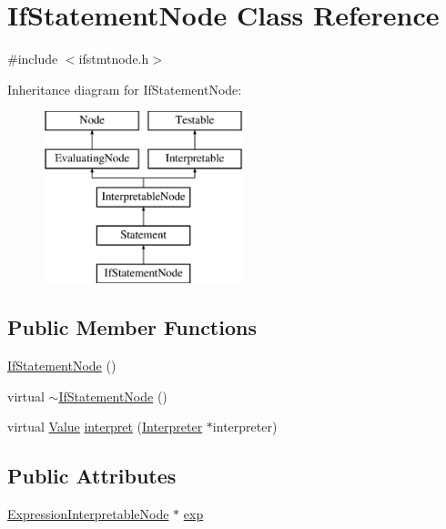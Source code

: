 \hypertarget{classIfStatementNode}{}\section{If\+Statement\+Node Class Reference}
\label{classIfStatementNode}


{\ttfamily \#include $<$ifstmtnode.\+h$>$}

Inheritance diagram for If\+Statement\+Node\+:\begin{figure}[H]
\begin{center}
\leavevmode
\includegraphics[height=5.000000cm]{classIfStatementNode}
\end{center}
\end{figure}
\subsection*{Public Member Functions}
\begin{DoxyCompactItemize}
\item 
\hyperlink{classIfStatementNode_a99188e8333e6d12e816bd5ba319a7da8}{If\+Statement\+Node} ()
\item 
virtual \hyperlink{classIfStatementNode_a81885b8c46c006ff58324e9121e0bab2}{$\sim$\+If\+Statement\+Node} ()
\item 
virtual \hyperlink{classValue}{Value} \hyperlink{classIfStatementNode_aef627f32330e55f8bb9e5ac2f2f5f3f8}{interpret} (\hyperlink{classInterpreter}{Interpreter} $\ast$interpreter)
\end{DoxyCompactItemize}
\subsection*{Public Attributes}
\begin{DoxyCompactItemize}
\item 
\hyperlink{classExpressionInterpretableNode}{Expression\+Interpretable\+Node} $\ast$ \hyperlink{classIfStatementNode_a021cd8dd0edd333f98d74cfd1c38acd0}{exp}
\end{DoxyCompactItemize}
